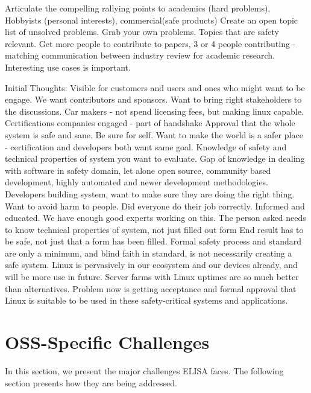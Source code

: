 \documentclass[12pt]{../Common_files/ElisaPaper}
\begin{document}
Articulate the compelling rallying points to 
academics (hard problems), 
Hobbyists (personal interests),
commercial(safe products)    
Create an open topic list of unsolved problems.  
Grab your own problems.   
 Topics that are safety relevant.    
 Get more people to contribute to papers,  3 or 4 people contributing - matching communication between industry review for academic research. 
Interesting use cases is important. 



Initial Thoughts:
Visible for customers and users and ones who might want to be engage.
We want contributors and sponsors.
Want to bring right stakeholders to the discussions.
Car makers - not spend licensing fees, but making linux capable.
Certifications companies engaged - part of handshake
Approval that the whole system is safe and sane.
Be sure for self. 
Want to make the world is a safer place - certification and developers both want same goal.
Knowledge of safety and technical properties of system you want to evaluate.
Gap of knowledge in dealing with software in safety domain,  let alone open source, community based development,  highly automated and newer development methodologies.
Developers building system, want to make sure they are doing the right thing.
Want to avoid harm to people.
Did everyone do their job correctly.
Informed and educated.
We have enough good experts working on this.    
The person asked needs to know technical properties of system,  not just filled out form
End result has to be safe,  not just that a form has been filled.
Formal safety process and standard are only a minimum,  and blind faith in standard, is not necessarily creating a safe system.
Linux is pervasively in our ecosystem and our devices already,  and will be more use in future.
Server farms with Linux uptimes are so much better than alternatives.   
Problem now is getting acceptance and formal approval that Linux is suitable to be used in these safety-critical systems and applications.  



\section{OSS-Specific Challenges}
\label{sec:OSS specific Challenges}
In this section, we present the major challenges ELISA faces.
The following section presents how they are being addressed.
\end{document}

